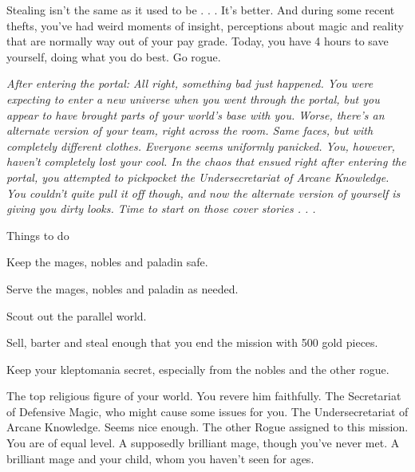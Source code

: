 \documentclass[char]{guildcamp3}
\begin{document}
Stealing isn't the same as it used to be . . . It's better. And during some recent thefts, you've had weird moments of insight, perceptions about magic and reality that are normally way out of your pay grade.  Today, you have 4 hours to save yourself, doing what you do best. Go rogue.

\em{After entering the portal:}
All right, something bad just happened. You were expecting to enter a new universe when you went through the portal, but you appear to have brought parts of your world's base with you. Worse, there's an alternate version of your team, right across the room. Same faces, but with completely different clothes. Everyone seems uniformly panicked.
You, however, haven't completely lost your cool. In the chaos that ensued right after entering the portal, you attempted to pickpocket the Undersecretariat of Arcane Knowledge. You couldn't quite pull it off though, and now the alternate version of yourself is giving you dirty looks. Time to start on those cover stories . . .

\begin{itemz}[Goals]
  \item Things to do
  \item Keep the mages, nobles and paladin safe.
  \item Serve the mages, nobles and paladin as needed.
  \item Scout out the parallel world.
  \item Sell, barter and steal enough that you end the mission with 500 gold pieces.
  \item Keep your kleptomania secret, especially from the nobles and the other rogue.  
\end{itemz}




\begin{contacts}
	\contact{\cPaladin{}} The top religious figure of your world. You revere him faithfully.
	\contact{\cNobleOne{}} The Secretariat of Defensive Magic, who might cause some issues for you.
	\contact{\cNobleTwo{}} The Undersecretariat of Arcane Knowledge. Seems nice enough.
	\contact{\cRogueOne{}} The other Rogue assigned to this mission. You are of equal level.
	\contact{\cMageOne{}} A supposedly brilliant mage, though you've never met.
    \contact{\cMageTwo{}} A brilliant mage and your child, whom you haven't seen for ages.
\end{contacts}
\end{document}

